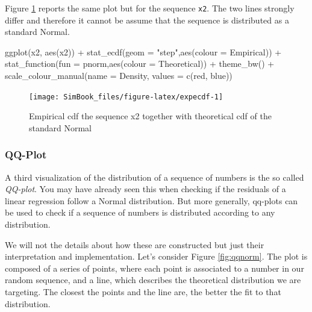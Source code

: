 \documentclass[
]{book}
\newenvironment{Shaded}{\begin{snugshade}}{\end{snugshade}}
\newcommand{\AttributeTok}[1]{\textcolor[rgb]{0.77,0.63,0.00}{#1}}
\newcommand{\FunctionTok}[1]{\textcolor[rgb]{0.00,0.00,0.00}{#1}}
\newcommand{\NormalTok}[1]{#1}
\newcommand{\SpecialCharTok}[1]{\textcolor[rgb]{0.00,0.00,0.00}{#1}}
\newcommand{\StringTok}[1]{\textcolor[rgb]{0.31,0.60,0.02}{#1}}
\begin{document}
Figure \ref{fig:expecdf} reports the same plot but for the sequence \texttt{x2}. The two lines strongly differ and therefore it cannot be assume that the sequence is distributed as a standard Normal.

\begin{Shaded}
\begin{Highlighting}[]
\FunctionTok{ggplot}\NormalTok{(x2, }\FunctionTok{aes}\NormalTok{(x2)) }\SpecialCharTok{+}
   \FunctionTok{stat\_ecdf}\NormalTok{(}\AttributeTok{geom =} \StringTok{"step"}\NormalTok{,}\FunctionTok{aes}\NormalTok{(}\AttributeTok{colour =} \StringTok{\textquotesingle{}Empirical\textquotesingle{}}\NormalTok{)) }\SpecialCharTok{+}
   \FunctionTok{stat\_function}\NormalTok{(}\AttributeTok{fun =}\NormalTok{ pnorm,}\FunctionTok{aes}\NormalTok{(}\AttributeTok{colour =} \StringTok{\textquotesingle{}Theoretical\textquotesingle{}}\NormalTok{)) }\SpecialCharTok{+}
   \FunctionTok{theme\_bw}\NormalTok{() }\SpecialCharTok{+}      
   \FunctionTok{scale\_colour\_manual}\NormalTok{(}\AttributeTok{name =} \StringTok{\textquotesingle{}Density\textquotesingle{}}\NormalTok{, }\AttributeTok{values =} \FunctionTok{c}\NormalTok{(}\StringTok{\textquotesingle{}red\textquotesingle{}}\NormalTok{, }\StringTok{\textquotesingle{}blue\textquotesingle{}}\NormalTok{))}
\end{Highlighting}
\end{Shaded}

\begin{figure}

{\centering \texttt{[image: SimBook\_files/figure-latex/expecdf-1]} 

}

\caption{Empirical cdf the sequence x2 together with theoretical cdf of the standard Normal}\label{fig:expecdf}
\end{figure}

\hypertarget{qq-plot}{%
\subsubsection{QQ-Plot}\label{qq-plot}}

A third visualization of the distribution of a sequence of numbers is the so called \emph{QQ-plot}. You may have already seen this when checking if the residuals of a linear regression follow a Normal distribution. But more generally, qq-plots can be used to check if a sequence of numbers is distributed according to any distribution.

We will not the details about how these are constructed but just their interpretation and implementation. Let's consider Figure \ref{fig:qqnorm}. The plot is composed of a series of points, where each point is associated to a number in our random sequence, and a line, which describes the theoretical distribution we are targeting. The closest the points and the line are, the better the fit to that distribution.
\end{document}
